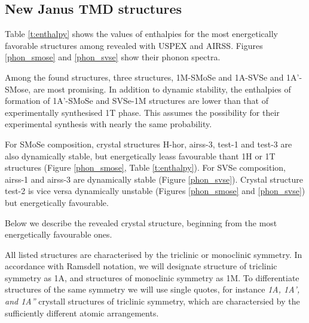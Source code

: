 \documentclass[a4paperm]{article}
\begin{document}
		\subsection{New Janus TMD structures}

Table \ref{t:enthalpy} shows the values of enthalpies for the most energetically favorable structures among revealed with USPEX and AIRSS.
 Figures \ref{phon_smose} and  \ref{phon_svse} show their phonon spectra. 
 
Among the found structures, three structures, 1M-SMoSe and 1A-SVSe and 1A'-SMose, are most promising.
In addition to dynamic stability, the enthalpies of formation of 1A'-SMoSe and SVSe-1M structures are lower than that of experimentally synthesised 1T phase.
This assumes the possibility for their experimental synthesis with nearly the same probability.

For SMoSe composition, crystal structures H-hor, airss-3, test-1 and test-3 are also dynamically stable, but energetically leass favourable thant 1H or 1T structures (Figure \ref{phon_smose}, Table \ref{t:enthalpy}).
For SVSe composition, airss-1 and airss-3 are dynamically stable (Figure \ref{phon_svse}).
Crystal structure test-2 is vice versa dynamically unstable (Figures \ref{phon_smose} and \ref{phon_svse}) but energetically favourable. 

Below we describe the revealed crystal structure, beginning from the most energetically favourable ones.

All listed structures are characterised by the triclinic or monocliniс symmetry.
In accordance with Ramsdell notation, we will designate structure of triclinic symmetry as 1A, and structures of monoclinic symmetry as 1M.
To differentiate structures of the same symmetry we will use single quotes, for instance {\it 1A, 1A', and 1A''} crystall structures of triclinic symmetry, which are charactersied by the sufficiently different atomic arrangements.

\end{document}
